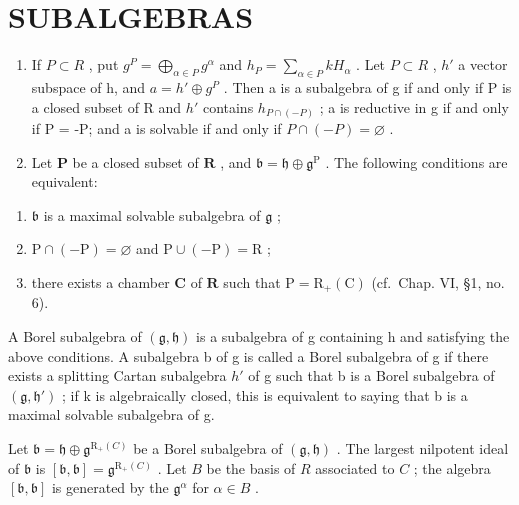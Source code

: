 \section*{SUBALGEBRAS}

\begin{enumerate}
\def\labelenumi{\arabic{enumi})}
\setcounter{enumi}{12}
\item
  If \(P \subset R\) , put \(g^{P} = \bigoplus_{\alpha \in P} g^{\alpha}\) and \(h_{P} = \sum_{\alpha \in P} kH_{\alpha}\) . Let \(P \subset R\) , \(h'\) a vector subspace of h, and \(a = h' \oplus g^{P}\) . Then a is a subalgebra of g if and only if P is a closed subset of R and \(h'\) contains \(h_{P \cap (-P)}\) ; a is reductive in g if and only if P = -P; and a is solvable if and only if \(P \cap (-P) = \varnothing\) .
\item
  Let \(\mathbf{P}\) be a closed subset of \(\mathbf{R}\) , and \(\mathfrak{b} = \mathfrak{h} \oplus \mathfrak{g}^{\mathrm{P}}\) . The following conditions are equivalent:
\end{enumerate}

\begin{enumerate}
\def\labelenumi{(\roman{enumi})}
\item
  \(\mathfrak{b}\) is a maximal solvable subalgebra of \(\mathfrak{g}\) ;
\item
  \(\mathrm{P} \cap (-\mathrm{P}) = \varnothing\) and \(\mathrm{P} \cup (-\mathrm{P}) = \mathrm{R}\) ;
\item
  there exists a chamber \(\mathbf{C}\) of \(\mathbf{R}\) such that \(\mathrm{P} = \mathrm{R}_{+}(\mathrm{C})\) (cf.~Chap. VI, §1, no. 6).
\end{enumerate}

A Borel subalgebra of \((\mathfrak{g},\mathfrak{h})\) is a subalgebra of g containing h and satisfying the above conditions. A subalgebra b of g is called a Borel subalgebra of g if there exists a splitting Cartan subalgebra \(h'\) of g such that b is a Borel subalgebra of \((\mathfrak{g},\mathfrak{h}')\) ; if k is algebraically closed, this is equivalent to saying that b is a maximal solvable subalgebra of g.

Let \(\mathfrak{b} = \mathfrak{h} \oplus \mathfrak{g}^{\mathrm{R}_{+}(C)}\) be a Borel subalgebra of \((\mathfrak{g}, \mathfrak{h})\) . The largest nilpotent ideal of \(\mathfrak{b}\) is \([\mathfrak{b}, \mathfrak{b}] = \mathfrak{g}^{\mathrm{R}_{+}(C)}\) . Let \(B\) be the basis of \(R\) associated to \(C\) ; the algebra \([\mathfrak{b}, \mathfrak{b}]\) is generated by the \(\mathfrak{g}^{\alpha}\) for \(\alpha \in B\) .

